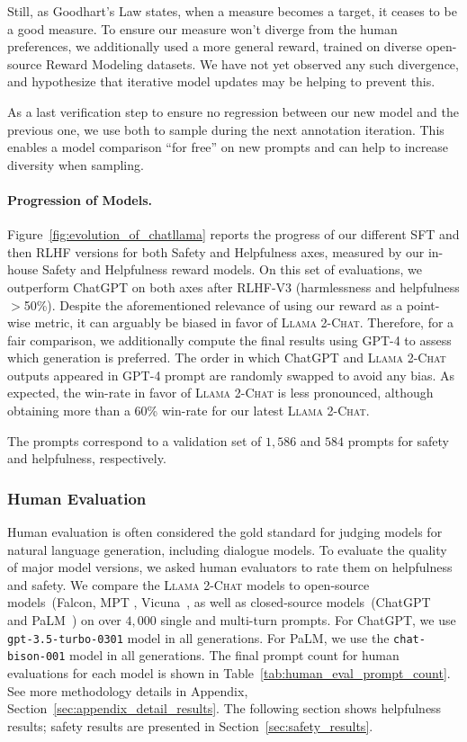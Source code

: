 \documentclass{article}
\newcommand{\modelname}{\textsc{Llama 2-Chat}\xspace}
\begin{document}
Still, as Goodhart's Law states, when a measure becomes a target, it ceases to be a good measure. To ensure our measure won't diverge from the human preferences, we additionally used a more general reward, trained on diverse open-source Reward Modeling datasets. We have not yet observed any such divergence, and hypothesize that iterative model updates may be helping to prevent this. 

As a last verification step to ensure no regression between our new model and the previous one, we use both to sample during the next annotation iteration. This enables a model comparison ``for free'' on new prompts and can help to increase diversity when sampling.

\paragraph{Progression of Models.} Figure~\ref{fig:evolution_of_chatllama} reports the progress of our different SFT and then RLHF versions for both Safety and Helpfulness axes, measured by our in-house Safety and Helpfulness reward models. On this set of evaluations, we outperform ChatGPT on both axes after RLHF-V3 (harmlessness and helpfulness $>$50\%). Despite the aforementioned relevance of using our reward as a point-wise metric, it can arguably be biased in favor of \modelname{}. Therefore, for a fair comparison, we additionally compute the final results using GPT-4 to assess which generation is preferred. The order in which ChatGPT and \modelname{} outputs appeared in GPT-4 prompt are randomly swapped to avoid any bias. As expected, the win-rate in favor of \modelname{} is less pronounced, although obtaining more than a 60\% win-rate for our latest \modelname{}.

The prompts correspond to a validation set of $1,586$ and $584$ prompts for safety and helpfulness, respectively. 

\subsubsection{Human Evaluation}
\label{sec:detail_results}

Human evaluation is often considered the gold standard for judging models for natural language generation, including dialogue models. To evaluate the quality of major model versions, we asked human evaluators to rate them on helpfulness and safety. We compare the \modelname models to open-source models~(Falcon, MPT \cite{MosaicML2023Introducing}, Vicuna~\cite{vicuna2023}, as well as closed-source models~(ChatGPT~\citep{openai2023gpt4} and PaLM~\cite{anil2023palm}) on over $4,000$ single and multi-turn prompts. For ChatGPT, we use \texttt{gpt-3.5-turbo-0301} model in all generations. For PaLM, we use the \texttt{chat-bison-001} model in all generations. The final prompt count for human evaluations for each model is shown in Table~\ref{tab:human_eval_prompt_count}. See more methodology details in Appendix, Section~\ref{sec:appendix_detail_results}. The following section shows helpfulness results; safety results are presented in Section~\ref{sec:safety_results}.
\end{document}
